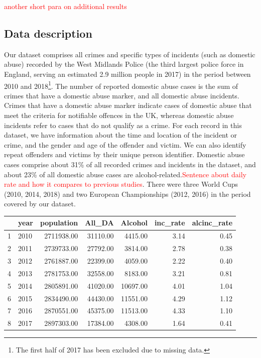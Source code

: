 \documentclass[12pt, letterpaper]{article}
\begin{document}
\textcolor{red}{another short para on additional results}



\subsection{Data description}

Our dataset comprises all crimes and specific types of incidents (such as domestic abuse) recorded by the West Midlands Police (the third largest police force in England\autocite{Homeoffice}, serving an estimated 2.9 million people in 2017\autocite{populationfigure}) in the period between 2010 and 2018\footnote{The first half of 2017 has been excluded due to missing data.}. The number of reported domestic abuse cases is the sum of crimes that have a domestic abuse marker, and all domestic abuse incidents. Crimes that have a domestic abuse marker indicate cases of domestic abuse that meet the criteria for notifiable offences in the UK, whereas domestic abuse incidents refer to cases that do not qualify as a crime. For each record in this dataset, we have information about the time and location of the incident or crime, and the gender and age of the offender and victim. We can also identify repeat offenders and victims by their unique person identifier. Domestic abuse cases comprise about 31\% of all recorded crimes and incidents in the dataset, and about 23\% of all domestic abuse cases are alcohol-related.\textcolor{red}{Sentence about daily rate and how it compares to previous studies}. There were three World Cups (2010, 2014, 2018) and two European Championships (2012, 2016) in the period covered by our dataset. 



\begin{table}[ht]
\centering
\begin{tabular}{rlrrrrr}
  \hline
 & year & population & All\_DA & Alcohol & inc\_rate & alcinc\_rate \\ 
  \hline
1 & 2010 & 2711938.00 & 31110.00 & 4415.00 & 3.14 & 0.45 \\ 
  2 & 2011 & 2739733.00 & 27792.00 & 3814.00 & 2.78 & 0.38 \\ 
  3 & 2012 & 2761887.00 & 22399.00 & 4059.00 & 2.22 & 0.40 \\ 
  4 & 2013 & 2781753.00 & 32558.00 & 8183.00 & 3.21 & 0.81 \\ 
  5 & 2014 & 2805891.00 & 41020.00 & 10697.00 & 4.01 & 1.04 \\ 
  6 & 2015 & 2834490.00 & 44430.00 & 11551.00 & 4.29 & 1.12 \\ 
  7 & 2016 & 2870551.00 & 45375.00 & 11513.00 & 4.33 & 1.10 \\ 
  8 & 2017 & 2897303.00 & 17384.00 & 4308.00 & 1.64 & 0.41 \\ 
   \hline
\end{tabular}
\end{table}
\end{document}
